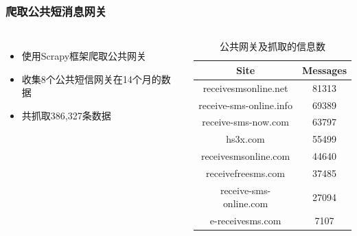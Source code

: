 \documentclass[10pt,aspectratio=43,mathserif]{beamer}
\renewcommand{\small}{\fontsize{8pt}{9.6pt}\selectfont}
\begin{document}
\begin{frame}
    \frametitle{\textbf{爬取公共短消息网关}}
    \begin{columns}
        \small
        \begin{itemize}
            \item 使用Scrapy框架爬取公共网关
            \item 收集8个公共短信网关在14个月的数据
            \item 共抓取386,327条数据
        \end{itemize}

        \begin{table}
            \caption{公共网关及抓取的信息数}
            \label{table1:gateways}
            \centering
            \small
            \begin{tabular}{|c|c|}
                \hline
                \textbf{Site}           & \textbf{Messages} \\
                \hline
                receivesmsonline.net    & 81313             \\
                \hline
                receive-sms-online.info & 69389             \\
                \hline
                receive-sms-now.com     & 63797             \\
                \hline
                hs3x.com                & 55499             \\
                \hline
                receivesmsonline.com    & 44640             \\
                \hline
                receivefreesms.com      & 37485             \\
                \hline
                receive-sms-online.com  & 27094             \\
                \hline
                e-receivesms.com        & 7107              \\
                \hline
            \end{tabular}
        \end{table}
    \end{columns}
\end{frame}
\end{document}
